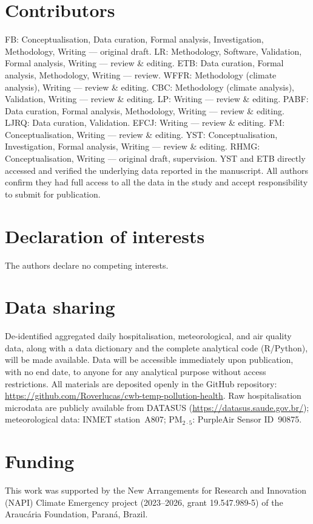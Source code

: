 \documentclass[review,number]{elsarticle}
\begin{document}
\section*{Contributors}
FB: Conceptualisation, Data curation, Formal analysis, Investigation,
Methodology, Writing --- original draft.
LR: Methodology, Software, Validation, Formal analysis, Writing ---
review \& editing.
ETB: Data curation, Formal analysis, Methodology, Writing --- review.
WFFR: Methodology (climate analysis), Writing --- review \& editing.
CBC: Methodology (climate analysis), Validation, Writing --- review \& editing.
LP: Writing --- review \& editing.
PABF: Data curation, Formal analysis, Methodology, Writing --- review \& editing.
LJRQ: Data curation, Validation.
EFCJ: Writing --- review \& editing.
FM: Conceptualisation, Writing --- review \& editing.
YST: Conceptualisation, Investigation, Formal analysis, Writing ---
review \& editing.
RHMG: Conceptualisation, Writing --- original draft, supervision.
YST and ETB directly accessed and verified the underlying data
reported in the manuscript. All authors confirm they had full access to all the
data in the study and accept responsibility to submit for publication.

\section*{Declaration of interests}
The authors declare no competing interests.

\section*{Data sharing}
De-identified aggregated daily hospitalisation, meteorological, and
air quality data, along with a data dictionary and the complete
analytical code (R/Python), will be made available. Data will be
accessible immediately upon publication, with no end date, to anyone
for any analytical purpose without access restrictions. All materials
are deposited openly in the GitHub repository:
{\sloppy\url{https://github.com/Roverlucas/cwb-temp-pollution-health}.}
Raw hospitalisation microdata are publicly available from DATASUS
(\url{https://datasus.saude.gov.br/}); meteorological data: INMET
station~A807; $\text{PM}_{2{\cdot}5}$: PurpleAir Sensor ID~90875.

\section*{Funding}
This work was supported by the New Arrangements for Research and
Innovation (NAPI) Climate Emergency project (2023--2026, grant
19.547.989-5) of the Arauc\'{a}ria Foundation, Paran\'{a}, Brazil.
\end{document}

